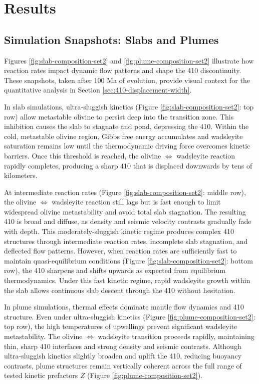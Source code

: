 \documentclass[
  paper=a4,
  ,captions=tableheading
]{scrartcl}
\begin{document}
\section{Results}\label{sec:results}

\subsection{Simulation Snapshots: Slabs and
Plumes}\label{sec:simulation-snapshots}

Figures \ref{fig:slab-composition-set2} and
\ref{fig:plume-composition-set2} illustrate how reaction rates impact
dynamic flow patterns and shape the 410 discontinuity. These snapshots,
taken after 100 Ma of evolution, provide visual context for the
quantitative analysis in Section \ref{sec:410-displacement-width}.

In slab simulations, ultra-sluggish kinetics (Figure
\ref{fig:slab-composition-set2}: top row) allow metastable olivine to
persist deep into the transition zone. This inhibition causes the slab
to stagnate and pond, depressing the 410. Within the cold, metastable
olivine region, Gibbs free energy accumulates and wadsleyite saturation
remains low until the thermodynamic driving force overcomes kinetic
barriers. Once this threshold is reached, the olivine
\(\Leftrightarrow\) wadsleyite reaction rapidly completes, producing a
sharp 410 that is displaced downwards by tens of kilometers.

At intermediate reaction rates (Figure \ref{fig:slab-composition-set2}:
middle row), the olivine \(\Leftrightarrow\) wadsleyite reaction still
lags but is fast enough to limit widespread olivine metastability and
avoid total slab stagnation. The resulting 410 is broad and diffuse, as
density and seismic velocity contrasts gradually fade with depth. This
moderately-sluggish kinetic regime produces complex 410 structures
through intermediate reaction rates, incomplete slab stagnation, and
deflected flow patterns. However, when reaction rates are sufficiently
fast to maintain quasi-equilibrium conditions (Figure
\ref{fig:slab-composition-set2}: bottom row), the 410 sharpens and
shifts upwards as expected from equilibrium thermodynamics. Under this
fast kinetic regime, rapid wadsleyite growth within the slab allows
continuous slab descent through the 410 without hesitation.

In plume simulations, thermal effects dominate mantle flow dynamics and
410 structure. Even under ultra-sluggish kinetics (Figure
\ref{fig:plume-composition-set2}: top row), the high temperatures of
upwellings prevent significant wadsleyite metastability. The olivine
\(\Leftrightarrow\) wadsleyite transition proceeds rapidly, maintaining
thin, sharp 410 interfaces and strong density and seismic contrasts.
Although ultra-sluggish kinetics slightly broaden and uplift the 410,
reducing buoyancy contrasts, plume structures remain vertically coherent
across the full range of tested kinetic prefactors \(Z\) (Figure
\ref{fig:plume-composition-set2}).
\end{document}
